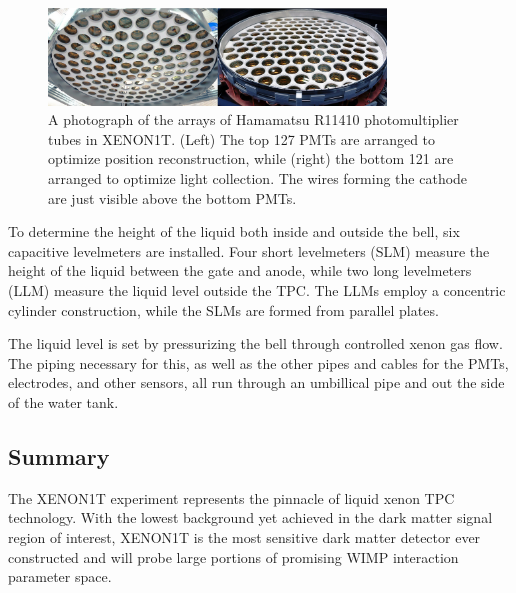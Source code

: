 \begin{figure}[htb]
\centering
    \includegraphics[width=0.8\textwidth]{figures/xe1t/pmt_arrays}
    \caption{A photograph of the arrays of Hamamatsu R11410 photomultiplier tubes in XENON1T. (Left) The top 127 PMTs are arranged to optimize position reconstruction, while (right) the bottom 121 are arranged to optimize light collection. The wires forming the cathode are just visible above the bottom PMTs.}\label{fig:pmt_arrays}
\end{figure}

To determine the height of the liquid both inside and outside the bell, six capacitive levelmeters are installed. Four short levelmeters (SLM) measure the height of the liquid between the gate and anode, while two long levelmeters (LLM) measure the liquid level outside the TPC. The LLMs employ a concentric cylinder construction, while the SLMs are formed from parallel plates.

The liquid level is set by pressurizing the bell through controlled xenon gas flow. The piping necessary for this, as well as the other pipes and cables for the PMTs, electrodes, and other sensors, all run through an umbillical pipe and out the side of the water tank.

\subsection{Summary}

The XENON1T experiment represents the pinnacle of liquid xenon TPC technology. With the lowest background yet achieved in the dark matter signal region of interest, XENON1T is the most sensitive dark matter detector ever constructed and will probe large portions of promising WIMP interaction parameter space.